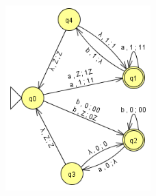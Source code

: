 \documentclass[12pt]{article}
\begin{document}
\begin{spacing}{1.5}
\begin{enumerate}
\begin{enumerate}
                              \begin{figure}[h!]
                                    \centering
                                    \includegraphics[width=0.5\textwidth]{img/q5/q5b.png}
                              \end{figure}

                  \end{enumerate}

      \end{enumerate}

\end{spacing}
\end{document}
